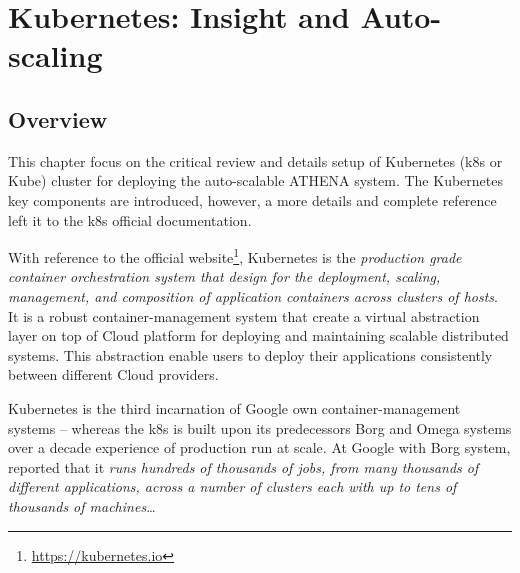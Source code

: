 \chapter{Kubernetes: Insight and Auto-scaling}

\label{Chapter4} 

\section{Overview}

This chapter focus on the critical review and details setup of Kubernetes (k8s or Kube) cluster for deploying the auto-scalable ATHENA system. The Kubernetes key components are introduced, however, a more details and complete reference left it to the k8s official documentation\parencite{kubeDoc}.

With reference to the official website\footnote{\url{https://kubernetes.io}}, Kubernetes is the \emph{production grade container orchestration system that design for the deployment, scaling, management, and composition of application containers across clusters of hosts}. It is a robust container-management system that create a virtual abstraction layer on top of Cloud platform for deploying and maintaining scalable distributed systems. This abstraction enable users to deploy their applications consistently between different Cloud providers.


Kubernetes is the third incarnation of Google own container-management systems -- whereas the k8s is built upon its predecessors Borg and Omega \parencite{44843} systems over a decade experience of production run at scale. At Google with Borg system, \parencite{43438} reported that it \emph{runs hundreds of thousands of jobs, from many thousands of different applications, across a number of clusters each with up to tens of thousands of machines}\ldots


